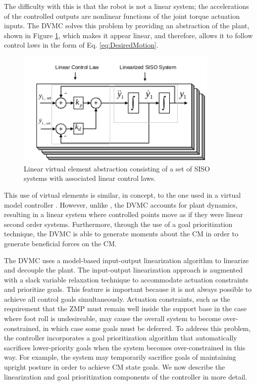 \documentclass{llncs}
\begin{document}
The difficulty with this is that the robot is not a linear system; the accelerations of the controlled outputs are nonlinear functions of the 
joint torque actuation inputs.  
The DVMC solves this problem by providing an abstraction of the plant, shown in Figure \ref{fig:LinearizationSISO}, which makes it appear linear, and
therefore, allows it to follow control laws in the form of Eq. \ref{eq:DesiredMotion}. 

\begin{figure}[b]
\includegraphics[height=2.2in]{LinearizationSISO}
\caption{Linear virtual element abstraction consisting of a set of SISO systems with associated linear control laws.}
\label{fig:LinearizationSISO}       
\end{figure}

This use of virtual elements is similar, in concept, to the one used in a virtual model controller \cite{pratt1997virtual}.  
However, unlike \cite{pratt1997virtual}, the DVMC accounts for plant dynamics, resulting in a linear system where controlled points move as if they were linear second order systems.  
Furthermore, through the use of a goal prioritization technique, the DVMC is able to generate moments about the CM in order to generate beneficial forces on the CM.

The DVMC uses a model-based input-output linearization algorithm \cite{slotine1991applied} to linearize and decouple the plant.  
The input-output linearization approach is augmented with a slack variable relaxation technique to accommodate actuation constraints and prioritize goals.  
This feature is important because it is not always possible to achieve all control goals simultaneously.  
Actuation constraints, such as the requirement that the ZMP must remain well inside the support base in the case where foot roll is undesireable, 
may cause the overall system to become over-constrained, in which case some goals must be deferred.  
To address this problem, the controller incorporates a goal prioritization algorithm that automatically sacrifices lower-priority goals when 
the system becomes over-constrained in this way.  
For example, the system may temporarily sacrifice goals of maintaining upright posture in order to achieve CM state goals.  
We now describe the linearization and goal prioritization components of the controller in more detail.
\end{document}
